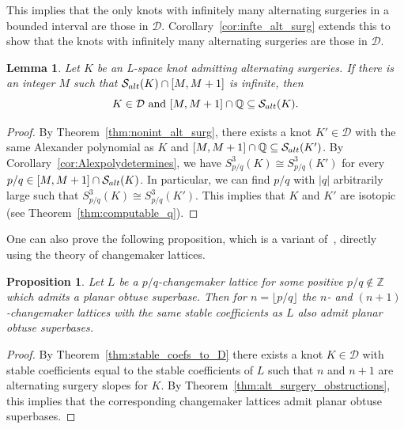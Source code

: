 \documentclass{amsart} %
\newcommand{\D}{\mathcal{D}}
\newcommand{\Z}{\mathbb{Z}}
\newcommand{\Q}{\mathbb{Q}}
\newcommand{\Salt}{\mathcal{S}_{\rm alt}}
\theoremstyle{thm}
\newtheorem{lem}[Theorem]{Lemma}
\newtheorem{prop}[Theorem]{Proposition}
\theoremstyle{definition}
\numberwithin{equation}{section}
\begin{document}
This implies that the only knots with infinitely many alternating surgeries in a bounded interval are those in $\D$. Corollary~\ref{cor:infte_alt_surg} extends this to show that the knots with infinitely many alternating surgeries are those in $\D$.
\begin{lem}\label{lem:infinite_alt_surg_in_interval}
Let $K$ be an L-space knot admitting alternating surgeries. If there is an integer $M$ such that $\Salt(K)\cap [M,M+1]$ is infinite, then 
\[
\text{$K\in\D$ and $[M,M+1]\cap \Q \subseteq \Salt(K)$.}
\]
\end{lem}
\begin{proof}
    By Theorem~\ref{thm:nonint_alt_surg}, there exists a knot $K'\in \D$ with the same Alexander polynomial as $K$ and $[M, M+1] \cap \Q \subseteq \Salt(K')$. By Corollary~\ref{cor:Alexpolydetermines}, we have $S_{p/q}^3(K)\cong S_{p/q}^3(K')$ for every $p/q\in [M,M+1]\cap \Salt(K)$. In particular, we can find $p/q$ with $|q|$ arbitrarily large such that $S_{p/q}^3(K)\cong S_{p/q}^3(K')$. This implies that $K$ and $K'$ are isotopic (see Theorem~\ref{thm:computable_q}).
\end{proof}

One can also prove the following proposition, which is a variant of~\cite[Proposition~4.2]{Mc17}, directly using the theory of changemaker lattices.
\begin{prop}\label{prop:altsurgimpliesintOSB2}
Let $L$ be a $p/q$-changemaker lattice for some positive $p/q\notin \Z$ which admits a planar obtuse superbase. Then for $n=\lfloor p/q \rfloor$ the $n$- and $(n+1)$-changemaker lattices with the same stable coefficients as $L$ also admit planar obtuse superbases.
\end{prop}
\begin{proof}
    By Theorem~\ref{thm:stable_coefs_to_D} there exists a knot $K\in\D$ with stable coefficients equal to the stable coefficients of $L$ such that $n$ and $n+1$ are alternating surgery slopes for $K$. By Theorem~\ref{thm:alt_surgery_obstructions}, this implies that the corresponding changemaker lattices admit planar obtuse superbases.
\end{proof}
\end{document}
